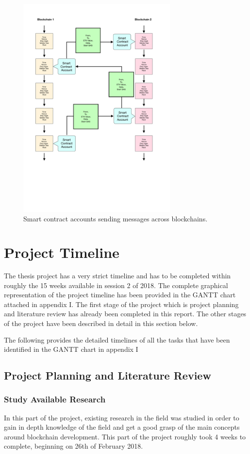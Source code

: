\documentclass[a4paper,twoside,phd]{BYUPhys}
\begin{document}
\begin{figure}[t]
\centering
\includegraphics[width=8cm]{cap1}
\caption{Smart contract accounts sending messages across blockchains.}
\label{fig:cap1}
\end{figure}

\section{Project Timeline}
The thesis project has a very strict timeline and has to be completed within roughly the 15 weeks available in session 2 of 2018. The complete graphical representation of the project timeline has been provided in the GANTT chart attached in appendix I. The first stage of the project which is project planning and literature review has already been completed in this report. The other stages of the project have been described in detail in this section below. \par
The following provides the detailed timelines of all the tasks that have been identified in the GANTT chart in appendix I
\subsection{Project Planning and Literature Review}
\subsubsection{Study Available Research}
In this part of the project, existing research in the field
was studied in order to gain in depth knowledge of the field and get a good grasp of the main concepts around blockchain development. This part of the project roughly took 4 weeks to complete, beginning on 26th of February 2018.
\end{document}
